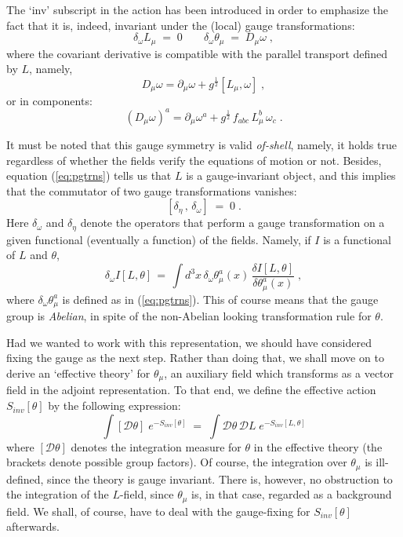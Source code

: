 \documentclass[a4paper,12pt]{article}
\begin{document}
The `inv' subscript in the action has been introduced in order to
emphasize the fact that it is, indeed, invariant under the (local)
gauge transformations:
\begin{equation}\label{eq:pgtrns}
\delta_\omega L_\mu \;=\; 0 \;\;\;\;\;\;\;
\delta_\omega \theta_\mu \;=\; D_\mu \omega \;,
\end{equation}
where the covariant derivative is compatible with the parallel
transport defined by $L$, namely,
\begin{equation}
D_\mu \omega = \partial_\mu \omega + g^{\frac{1}{2}} [L_\mu , \omega]
\;,
\end{equation}
or in components:
\begin{equation}
(D_\mu \omega)^a = \partial_\mu \omega^a + g^{\frac{1}{2}}
\, f_{a b c} \, L_\mu^b \,  \omega_c \;.
\end{equation}

It must be noted that this gauge symmetry is valid {\em of-shell},
namely, it holds true regardless of whether the fields verify the
equations of motion or not. Besides, equation (\ref{eq:pgtrns}) tells
us that $L$ is a gauge-invariant object, and this implies that the
commutator of two gauge transformations vanishes:
\begin{equation}\label{eq:polcomm}
\left[\delta_\eta \,,\, \delta_\omega \right]\;=\; 0 \;.
\end{equation}
Here $\delta_\omega$ and $\delta_\eta$ denote the operators that
perform a gauge transformation on a given functional (eventually a
function) of the fields.  Namely, if $I$ is a functional of $L$ and
$\theta$,
\begin{equation}
\delta_\omega I[L,\theta] \,=\, \int d^3x \, \delta_\omega
\theta_\mu^a (x) \, \frac{\delta I[L,\theta]}{\delta \theta_\mu^a (x)} 
\;,
\end{equation}
where $\delta_\omega \theta_\mu^a$ is defined as in (\ref{eq:pgtrns}).
This of course means that the gauge group is {\em Abelian}, in spite
of the non-Abelian looking transformation rule for $\theta$.

Had we wanted to work with this representation, we should have
considered fixing the gauge as the next step. Rather than doing that,
we shall move on to derive an `effective theory' for $\theta_\mu$, an
auxiliary field which transforms as a vector field in the adjoint
representation.  To that end, we define the effective action
$S_{inv}[\theta]$ by the following expression:
\begin{equation}\label{eq:defst}
\int [{\mathcal D} \theta ] \; e^{ - S_{inv}[\theta] }
\;=\; \int {\mathcal D}\theta \, {\mathcal D}L \; e^{-S_{inv}[L,\theta]}
\end{equation}
where $[{\mathcal D}\theta]$ denotes the integration measure for
$\theta$ in the effective theory (the brackets denote possible group
factors).  Of course, the integration over $\theta_\mu$ is
ill-defined, since the theory is gauge invariant. There is, however,
no obstruction to the integration of the $L$-field, since $\theta_\mu$
is, in that case, regarded as a background field.  We shall, of
course, have to deal with the gauge-fixing for $S_{inv}[\theta]$
afterwards.
\end{document}
